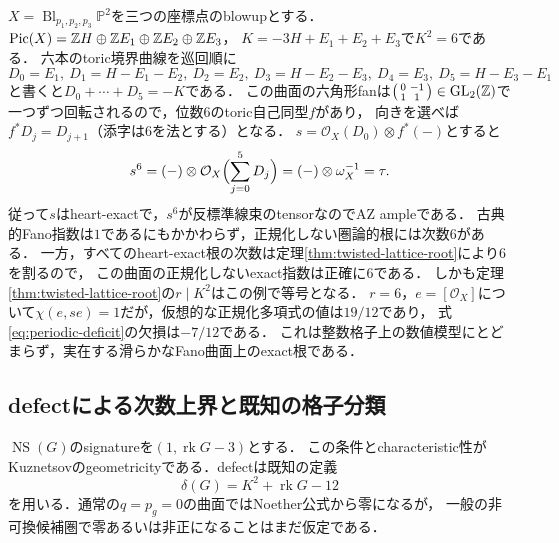 \documentclass[11pt,a4paper]{ltjsarticle}
\begin{document}
\begin{example}\label{ex:hexagon-sixth-root}
$X=\operatorname{Bl}_{p_1,p_2,p_3}\mathbb P^2$を三つの座標点のblowupとする．
$\operatorname{Pic}(X)=\mathbb Z H\oplus\mathbb Z E_1\oplus\mathbb Z E_2\oplus\mathbb Z E_3$，
$K=-3H+E_1+E_2+E_3$で$K^2=6$である．
六本のtoric境界曲線を巡回順に
\[
 D_0=E_1,\ D_1=H-E_1-E_2,\ D_2=E_2,\
 D_3=H-E_2-E_3,\ D_4=E_3,\ D_5=H-E_3-E_1
\]
と書くと$D_0+\cdots+D_5=-K$である．
この曲面の六角形fanは$\begin{psmallmatrix}0&-1\\1&1\end{psmallmatrix}\in
\operatorname{GL}_2(\mathbb Z)$で一つずつ回転されるので，位数6のtoric自己同型$f$があり，
向きを選べば$f^*D_j=D_{j+1}$（添字は$6$を法とする）となる．
$s=\mathcal O_X(D_0)\otimes f^*(-)$とすると
\[
 s^6=(-)\otimes\mathcal O_X\Bigl(\sum_{j=0}^{5}D_j\Bigr)
 =(-)\otimes\omega_X^{-1}=\tau.
\]
従って$s$はheart-exactで，$s^6$が反標準線束のtensorなのでAZ ampleである．
古典的Fano指数は$1$であるにもかかわらず，正規化しない圏論的根には次数$6$がある．
一方，すべてのheart-exact根の次数は定理\ref{thm:twisted-lattice-root}により$6$を割るので，
この曲面の正規化しないexact指数は正確に$6$である．
しかも定理\ref{thm:twisted-lattice-root}の$r\mid K^2$はこの例で等号となる．
$r=6$，$e=[\mathcal O_X]$について$\chi(e,se)=1$だが，仮想的な正規化多項式の値は$19/12$であり，
式\eqref{eq:periodic-deficit}の欠損は$-7/12$である．
これは整数格子上の数値模型にとどまらず，実在する滑らかなFano曲面上のexact根である．
\end{example}

\subsection{defectによる次数上界と既知の格子分類}
$\operatorname{NS}(G)$のsignatureを$(1,\operatorname{rk}G-3)$とする．
この条件とcharacteristic性がKuznetsovのgeometricityである．defectは既知の定義
\begin{equation}\label{eq:defect}
 \delta(G)=K^2+\operatorname{rk}G-12
\end{equation}
を用いる\cite[Definition 5.3]{Kuz}．通常の$q=p_g=0$の曲面ではNoether公式から零になるが，
一般の非可換候補圏で零あるいは非正になることはまだ仮定である．
\end{document}
